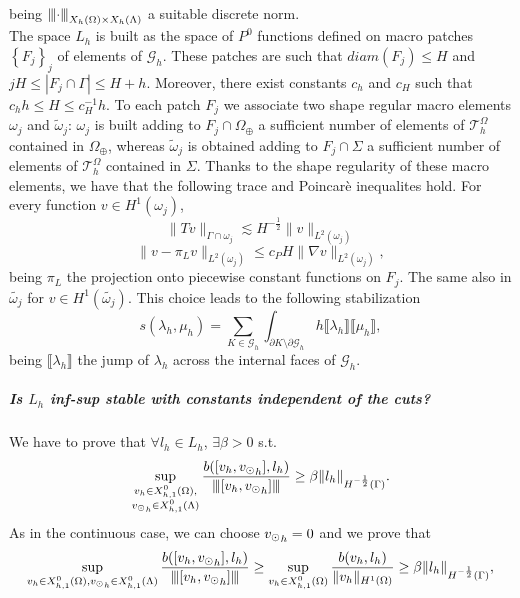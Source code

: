 being ${\left\vert\kern-0.25ex\left\vert\kern-0.25ex\left\vert \cdot  \right\vert\kern-0.25ex\right\vert\kern-0.25ex\right\vert}_{X_h(\Omega)\times X_h(\Lambda) }$ a suitable discrete norm. \\
The space $L_h$ is built as the space of $P^0$ functions defined on macro patches $\left\{ F_j \right\}_j$ of elements of $\mathcal{G}_h$. These patches are such that $diam(F_j)\leq H$ and  $jH\leq |F_j\cap \Gamma|\leq H+h$. Moreover, there exist constants $c_h$ and $c_H$ such that $c_hh\leq H \leq c_H^{-1}h$. To each patch $F_j$ we associate two shape regular macro elements $\omega_j$ and $\tilde{\omega}_j$: $\omega_j$ is built adding to $F_j \cap \Omega_{\oplus}$ a sufficient number of elements of $\mathcal{T}_h^{\Omega}$ contained in $\Omega_{\oplus}$, whereas $\tilde{\omega}_j$ is obtained adding to $F_j \cap\Sigma$ a sufficient number of elements of $\mathcal{T}_h^{\Omega}$ contained in $\Sigma$. Thanks to the shape regularity of these macro elements, we have that the following trace and Poincarè inequalites hold. For every function $v\in H^1(\omega_j)$,
\begin{equation}\label{discr_trace_ineq}
\|Tv\|_{\Gamma\cap \omega_j} \lesssim H^{-\frac 12} \|v\|_{L^2(\omega_j)}
\end{equation}
\begin{equation}\label{disc_poincare_ineq}
\|v- \pi_Lv\|_{L^2(\omega_j)} \leq c_P H \|\nabla v\|_{L^2(\omega_j)},
\end{equation}
being $\pi_L$ the projection onto piecewise constant functions on $F_j$.
The same also in $\tilde{\omega _j}$ for $v\in H^1(\tilde{\omega _j})$. This choice leads to the following stabilization 
\begin{equation*}
s(\lambda_h, \mu_h)= \sum _{K\in \mathcal{G}_h} \int_{\partial K \setminus \partial \mathcal{G}_h} h \llbracket \lambda_h \rrbracket \llbracket \mu_h \rrbracket,
\end{equation*}
being $\llbracket \lambda_h \rrbracket$ the jump of $\lambda_h$ across the internal faces of $\mathcal{G}_h$.
\subparagraph{Is $L_h$ inf-sup stable with constants independent of the cuts?} We have to prove that $\forall l_h \in L_h$, $\exists \beta >0$ s.t.
\begin{equation*}
\sup_{\substack{v_h \in X_{h,1}^0(\Omega),\\ {v_{\odot}}_h \in X_{h,1}^0(\Lambda)}} \frac{b([v_h, {v_{\odot}}_h], l_h)}{{\left\vert\kern-0.25ex\left\vert\kern-0.25ex\left\vert [v_h, {v_{\odot}}_h] \right\vert\kern-0.25ex\right\vert\kern-0.25ex\right\vert}} \geq \beta \|l_h\|_{H^{-\frac 12}(\Gamma)}.
\end{equation*}
As in the continuous case, we can choose ${v_{\odot}}_h=0$ and we prove that
\begin{equation*} 
\sup_{v_h \in X_{h,1}^0(\Omega),\\ {v_{\odot}}_h \in X_{h,1}^0(\Lambda)} \frac{b([v_h, {v_{\odot}}_h], l_h)}{{\left\vert\kern-0.25ex\left\vert\kern-0.25ex\left\vert [v_h, {v_{\odot}}_h] \right\vert\kern-0.25ex\right\vert\kern-0.25ex\right\vert}} \geq  \sup_{v_h \in X_{h,1}^0(\Omega)} \frac{b(v_h, l_h)}{\|v_h\|_{H^1(\Omega)}} \geq \beta \|l_h\|_{H^{-\frac 12}(\Gamma)}, 
\end{equation*}
